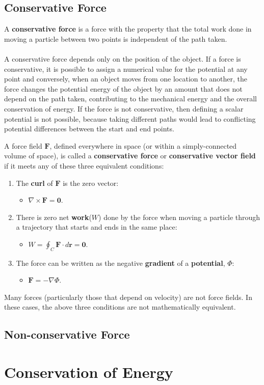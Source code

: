 	\subsection{Conservative Force}
A \textbf{conservative force} is a force with the property that the total work done in moving a particle between two points is independent of the path taken.
\\\\
A conservative force depends only on the position of the object. If a force is conservative, it is possible to assign a numerical value for the potential at any point and conversely, when an object moves from one location to another, the force changes the potential energy of the object by an amount that does not depend on the path taken, contributing to the mechanical energy and the overall conservation of energy. If the force is not conservative, then defining a scalar potential is not possible, because taking different paths would lead to conflicting potential differences between the start and end points.
\begin{definition}
A force field $\mathbf{F}$, defined everywhere in space (or within a simply-connected volume of space), is called a \textbf{conservative force} or \textbf{conservative vector field} if it meets any of these three equivalent conditions:
	\begin{enumerate}
	\item The \textbf{curl} of $\mathbf{F}$ is the zero vector:
		\begin{itemize}
		\item $\nabla\times\mathbf{F} = \mathbf{0}$.
		\end{itemize}
	\item There is zero net \textbf{work}($W$) done by the force when moving a particle through a trajectory that starts and ends in the same place:
		\begin{itemize}
		\item $W = \oint_C\mathbf{F}\cdot d\mathbf{r} = \mathbf{0}$.
		\end{itemize}
	\item The force can be written as the negative \textbf{gradient} of a \textbf{potential}, $\Phi$:
		\begin{itemize}
		\item $\mathbf{F} = -\nabla\Phi$.
		\end{itemize}
	\end{enumerate}
\end{definition}
Many forces (particularly those that depend on velocity) are not force fields. In these cases, the above three conditions are not mathematically equivalent. 
	\subsection{Non-conservative Force}
\section{Conservation of Energy}